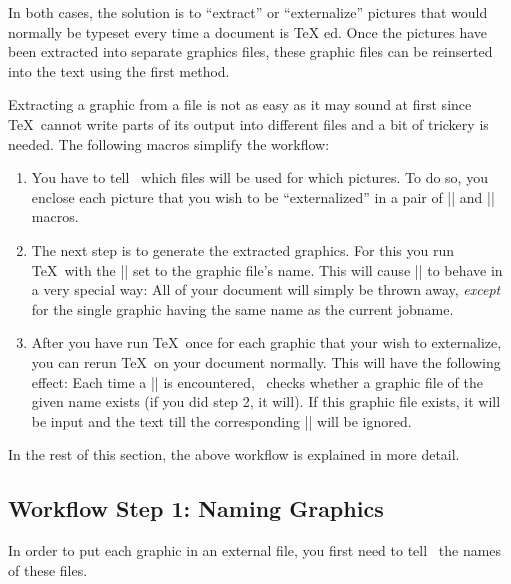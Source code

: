 In both cases, the solution is to ``extract'' or ``externalize''
pictures that would normally be typeset every time a document is \TeX
ed. Once the pictures have been extracted into separate graphics
files, these graphic files can be reinserted into the text using the
first method.

Extracting a graphic from a file is not as easy as it may sound at
first since \TeX\ cannot write parts of its output into different
files and a bit of trickery is needed. The following macros
simplify the workflow:

\begin{enumerate}
\item You have to tell \pgfname\ which files will be used for which
  pictures. To do so, you enclose each picture that you wish to be
  ``externalized'' in a pair of |\beginpgfgraphicnamed| and
  |\endpgfgraphicnamed| macros.
\item The next step is to generate the extracted graphics. For this
  you run \TeX\ with the |\jobname| set to the graphic file's
  name. This will cause |\pgfname| to behave in a very special way:
  All of your document will simply be thrown away, \emph{except} for
  the single graphic having the same name as the current jobname.
\item After you have run \TeX\ once for each graphic that your wish to
  externalize, you can rerun \TeX\ on your document normally. This
  will have the following effect: Each time a |\beginpgfgraphicnamed|
  is encountered, \pgfname\ checks whether a graphic file of the given
  name exists (if you did step 2, it will). If this graphic file
  exists, it will be input and the text till the corresponding
  |\endpgfgraphicnamed| will be ignored.
\end{enumerate}

In the rest of this section, the above workflow is explained in more
detail.


\subsection{Workflow Step 1: Naming Graphics}

In order to put each graphic in an external file, you first need to
tell \pgfname\ the names of these files.

